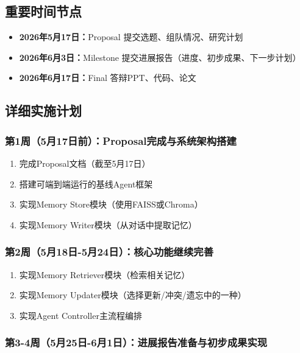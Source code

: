 \documentclass[11pt]{article}
\begin{document}
\subsection{重要时间节点}

\begin{itemize}
\item \textbf{2026年5月17日：}Proposal 提交选题、组队情况、研究计划
\item \textbf{2026年6月3日：}Milestone 提交进展报告（进度、初步成果、下一步计划）
\item \textbf{2026年6月17日：}Final 答辩PPT、代码、论文
\end{itemize}

\subsection{详细实施计划}

\subsubsection{第1周（5月17日前）：Proposal完成与系统架构搭建}

\begin{enumerate}
\item 完成Proposal文档（截至5月17日）
\item 搭建可端到端运行的基线Agent框架
\item 实现Memory Store模块（使用FAISS或Chroma）
\item 实现Memory Writer模块（从对话中提取记忆）
\end{enumerate}

\subsubsection{第2周（5月18日-5月24日）：核心功能继续完善}

\begin{enumerate}
\item 实现Memory Retriever模块（检索相关记忆）
\item 实现Memory Updater模块（选择更新/冲突/遗忘中的一种）
\item 实现Agent Controller主流程编排
\end{enumerate}

\subsubsection{第3-4周（5月25日-6月1日）：进展报告准备与初步成果实现}
\end{document}
